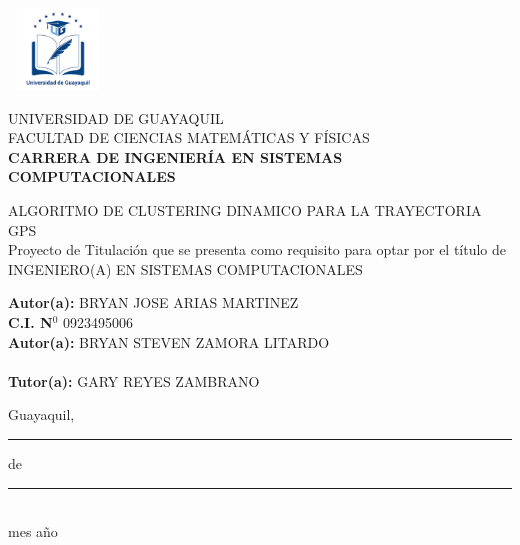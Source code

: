 \documentclass[12pt, a4paper, nofontenc, numbers=endperiod]{apa7}
\begin{document}
	{ %
		\begin{center}	
			\includegraphics[width=2.65cm,height=2.17cm]{Imagenes/Figura1}
		\end{center}
		\begin{center}	
			UNIVERSIDAD DE GUAYAQUIL \\[-0.1cm]
			FACULTAD DE CIENCIAS MATEMÁTICAS Y FÍSICAS \\ [-0.1cm]
			\textbf{ CARRERA DE INGENIERÍA EN SISTEMAS COMPUTACIONALES}
		\end{center}
		\begin{center}
			ALGORITMO DE CLUSTERING DINAMICO PARA LA TRAYECTORIA GPS \\
				
			\vspace*{1cm}	
			Proyecto de Titulación que se presenta como requisito para optar por el título de \\
			INGENIERO(A) EN SISTEMAS COMPUTACIONALES	
		\end{center}
		\vspace*{1.5cm}
		\begin{flushright}
			\begin{minipage}[b]{10cm}
				\hspace*{2.1cm}\textbf{Autor(a):} BRYAN JOSE ARIAS MARTINEZ \\
				\hspace*{6.5cm}\textbf{C.I. N$^{0}$ }0923495006\\
				\hspace*{1.2cm}\textbf{Autor(a):} BRYAN STEVEN ZAMORA LITARDO \\
					\\
					\hspace*{3.1cm}\textbf{Tutor(a):} GARY REYES ZAMBRANO
				\end{minipage}
			\end{flushright}
			\vspace*{0.7cm}
			\begin{center}
				\singlespacing Guayaquil,\rule[0mm]{10mm}{0.1mm} de \rule[0mm]{10mm}{0.1mm}\\
				\hspace{1.5cm} mes \hspace{0.5cm}  año
			\end{center}
		}
\end{document}

